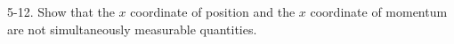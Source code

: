 \documentclass[12pt]{article}
\begin{document}
5-12.
Show that the $x$ coordinate of position and the
$x$ coordinate of momentum are not simultaneously
measurable quantities.
\end{document}
